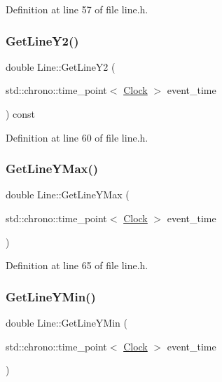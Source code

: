 Definition at line 57 of file line.\+h.

\mbox{\label{class_line_a6222d15f883f3183ec9eed085046916a}} 
\subsubsection{\texorpdfstring{Get\+Line\+Y2()}{GetLineY2()}}
{\footnotesize\ttfamily double Line\+::\+Get\+Line\+Y2 (\begin{DoxyParamCaption}\item[{std\+::chrono\+::time\+\_\+point$<$ \hyperlink{universe_8h_a0ef8d951d1ca5ab3cfaf7ab4c7a6fd80}{Clock} $>$}]{event\+\_\+time }\end{DoxyParamCaption}) const\hspace{0.3cm}{\ttfamily [inline]}}



Definition at line 60 of file line.\+h.

\mbox{\label{class_line_ab033cff3a24b67be829759d16f13c281}} 
\subsubsection{\texorpdfstring{Get\+Line\+Y\+Max()}{GetLineYMax()}}
{\footnotesize\ttfamily double Line\+::\+Get\+Line\+Y\+Max (\begin{DoxyParamCaption}\item[{std\+::chrono\+::time\+\_\+point$<$ \hyperlink{universe_8h_a0ef8d951d1ca5ab3cfaf7ab4c7a6fd80}{Clock} $>$}]{event\+\_\+time }\end{DoxyParamCaption})\hspace{0.3cm}{\ttfamily [inline]}}



Definition at line 65 of file line.\+h.

\mbox{\label{class_line_ae8151f5f3b102924b09de686f536e220}} 
\subsubsection{\texorpdfstring{Get\+Line\+Y\+Min()}{GetLineYMin()}}
{\footnotesize\ttfamily double Line\+::\+Get\+Line\+Y\+Min (\begin{DoxyParamCaption}\item[{std\+::chrono\+::time\+\_\+point$<$ \hyperlink{universe_8h_a0ef8d951d1ca5ab3cfaf7ab4c7a6fd80}{Clock} $>$}]{event\+\_\+time }\end{DoxyParamCaption})\hspace{0.3cm}{\ttfamily [inline]}}



